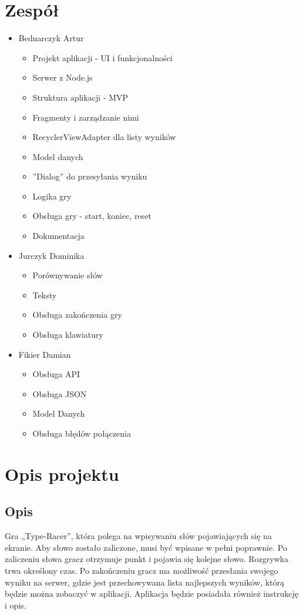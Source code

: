 \documentclass[12pt,a4paper]{article}
\begin{document}
	\section{Zespół}
	\begin{itemize}
	    \item Bednarczyk Artur \begin{itemize}
	        \item Projekt aplikacji - UI i funkcjonalności
	        \item Serwer z Node.js
	        \item Struktura aplikacji - MVP
	        \item Fragmenty i zarządzanie nimi
	        \item RecyclerViewAdapter dla listy wyników
	        \item Model danych
	        \item ''Dialog'' do przesyłania wyniku
	        \item Logika gry
	        \item Obsługa gry - start, koniec, reset
	        \item Dokumentacja
	    \end{itemize}
	    \item Jurczyk Dominika \begin{itemize}
	        \item Porównywanie słów
	        \item Teksty
	        \item Obsługa zakończenia gry
	        \item Obsługa klawiatury
	    \end{itemize}
	    \item Fikier Damian \begin{itemize}
	        \item Obsługa API
	        \item Obsługa JSON
	        \item Model Danych
	        \item Obsługa błędów połączenia
	    \end{itemize}
	\end{itemize}
	\clearpage
	\section{Opis projektu}
		\subsection{Opis}
			Gra „Type-Racer”, która polega na wpisywaniu słów pojawiających się na ekranie. Aby słowo zostało zaliczone, musi być wpisane w pełni poprawnie. Po zaliczeniu słowa gracz otrzymuje punkt i pojawia się kolejne słowo. Rozgrywka trwa określony czas. Po zakończeniu gracz ma możliwość przesłania swojego wyniku na serwer, gdzie jest przechowywana lista najlepszych wyników, którą będzie można zobaczyć w aplikacji. Aplikacja będzie posiadała również instrukcję i opis.
\end{document}
